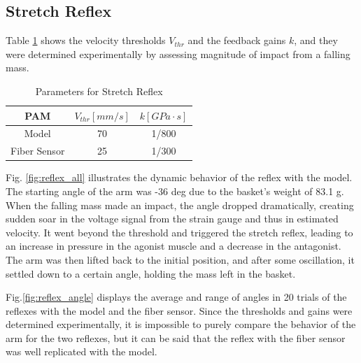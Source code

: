 \subsection{Stretch Reflex}
Table \ref{tab:reflex_para} shows the velocity thresholds $V_{thr}$ and the feedback gains $k$, and they were determined experimentally by assessing magnitude of impact from a falling mass. 
\begin{table}[h]
    \centering
    \caption{Parameters for Stretch Reflex} 
    \begin{tabular}{c|cc}
        \hline
        PAM &$V_{thr} [\si{mm/s}]$&$ k [\si{GPa\cdot s}]$\\
        \hline \hline
        Model & 70 & 1/800\\
        Fiber Sensor & 25 & 1/300\\
        \hline
    \end{tabular}
\label{tab:reflex_para}
\end{table}
Fig. \ref{fig:reflex_all} illustrates the dynamic behavior of the reflex with the model. The starting angle of the arm was -36 deg due to the basket's weight of 83.1 g. When the falling mass made an impact, the angle dropped dramatically, creating sudden soar in the voltage signal from the strain gauge and thus in estimated velocity. It went beyond the threshold and triggered the stretch reflex, leading to an increase in pressure in the agonist muscle and a decrease in the antagonist. The arm was then lifted back to the initial position, and after some oscillation, it settled down to a certain angle, holding the mass left in the basket.

Fig.\ref{fig:reflex_angle} displays the average and range of angles in 20 trials of the reflexes with the model and the fiber sensor. Since the thresholds and gains were determined experimentally, it is impossible to purely compare the behavior of the arm for the two reflexes, but it can be said that the reflex with the fiber sensor was well replicated with the model.


